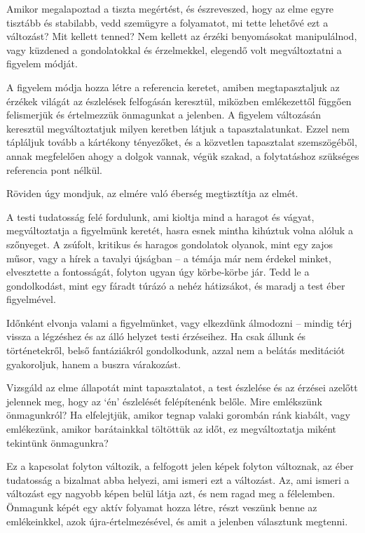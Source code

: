 Amikor megalapoztad a tiszta megértést, és észreveszed, hogy az elme
egyre tisztább és stabilabb, vedd szemügyre a folyamatot, mi tette
lehetővé ezt a változást? Mit kellett tenned? Nem kellett az érzéki
benyomásokat manipulálnod, vagy küzdened a gondolatokkal és érzelmekkel,
elegendő volt megváltoztatni a figyelem módját.

A figyelem módja hozza létre a referencia keretet, amiben
megtapasztaljuk az érzékek világát az észlelések felfogásán keresztül,
miközben emlékezettől függően felismerjük és értelmezzük önmagunkat a
jelenben. A figyelem változásán keresztül megváltoztatjuk milyen
keretben látjuk a tapasztalatunkat. Ezzel nem tápláljuk tovább a
kártékony tényezőket, és a közvetlen tapasztalat szemszögéből, annak
megfelelően ahogy a dolgok vannak, végük szakad, a folytatáshoz
szükséges referencia pont nélkül.

Röviden úgy mondjuk, az elmére való éberség megtisztítja az elmét.

A testi tudatosság felé fordulunk, ami kioltja mind a haragot és vágyat,
megváltoztatja a figyelmünk keretét, hasra esnek mintha kihúztuk volna
alóluk a szőnyeget. A zsúfolt, kritikus és haragos gondolatok olyanok,
mint egy zajos műsor, vagy a hírek a tavalyi újságban -- a témája már
nem érdekel minket, elvesztette a fontosságát, folyton ugyan úgy
körbe-körbe jár. Tedd le a gondolkodást, mint egy fáradt túrázó a nehéz
hátizsákot, és maradj a test éber figyelmével.

Időnként elvonja valami a figyelmünket, vagy elkezdünk álmodozni --
mindig térj vissza a légzéshez és az álló helyzet testi érzéseihez. Ha
csak állunk és történetekről, belső fantáziákról gondolkodunk, azzal nem
a belátás meditációt gyakoroljuk, hanem a buszra várakozást.

Vizsgáld az elme állapotát mint tapasztalatot, a test észlelése és az
érzései azelőtt jelennek meg, hogy az `én' észlelését felépítenénk
belőle. Mire emlékszünk önmagunkról? Ha elfelejtjük, amikor tegnap
valaki gorombán ránk kiabált, vagy emlékezünk, amikor barátainkkal
töltöttük az időt, ez megváltoztatja miként tekintünk önmagunkra?

Ez a kapcsolat folyton változik, a felfogott jelen képek folyton
változnak, az éber tudatosság a bizalmat abba helyezi, ami ismeri ezt a
változást. Az, ami ismeri a változást egy nagyobb képen belül látja azt,
és nem ragad meg a félelemben. Önmagunk képét egy aktív folyamat hozza
létre, részt veszünk benne az emlékeinkkel, azok újra-értelmezésével, és
amit a jelenben választunk megtenni.


